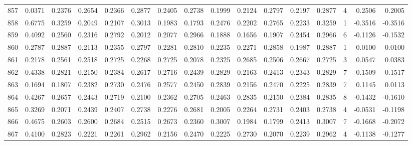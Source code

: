 \begin{tabular}{lrrrrrrrrrrrrrrr}
857 &      0.0371 &  0.2376 &  0.2654 &  0.2366 &  0.2877 &  0.2405 &  0.2738 &  0.1999 &  0.2124 &  0.2797 &   0.2197 &     0.2877 &      4 &                    0.2506 &                     0.2005 \\
858 &      0.6775 &  0.3259 &  0.2049 &  0.2107 &  0.3013 &  0.1983 &  0.1793 &  0.2476 &  0.2202 &  0.2765 &   0.2233 &     0.3259 &      1 &                   -0.3516 &                    -0.3516 \\
859 &      0.4092 &  0.2560 &  0.2316 &  0.2792 &  0.2012 &  0.2077 &  0.2966 &  0.1888 &  0.1656 &  0.1907 &   0.2454 &     0.2966 &      6 &                   -0.1126 &                    -0.1532 \\
860 &      0.2787 &  0.2887 &  0.2113 &  0.2355 &  0.2797 &  0.2281 &  0.2810 &  0.2235 &  0.2271 &  0.2858 &   0.1987 &     0.2887 &      1 &                    0.0100 &                     0.0100 \\
861 &      0.2178 &  0.2561 &  0.2518 &  0.2725 &  0.2268 &  0.2725 &  0.2078 &  0.2325 &  0.2685 &  0.2506 &   0.2667 &     0.2725 &      3 &                    0.0547 &                     0.0383 \\
862 &      0.4338 &  0.2821 &  0.2150 &  0.2384 &  0.2617 &  0.2716 &  0.2439 &  0.2829 &  0.2163 &  0.2413 &   0.2343 &     0.2829 &      7 &                   -0.1509 &                    -0.1517 \\
863 &      0.1694 &  0.1807 &  0.2382 &  0.2730 &  0.2476 &  0.2577 &  0.2450 &  0.2839 &  0.2156 &  0.2470 &   0.2225 &     0.2839 &      7 &                    0.1145 &                     0.0113 \\
864 &      0.4267 &  0.2657 &  0.2443 &  0.2719 &  0.2100 &  0.2362 &  0.2705 &  0.2463 &  0.2835 &  0.2150 &   0.2384 &     0.2835 &      8 &                   -0.1432 &                    -0.1610 \\
865 &      0.3269 &  0.2071 &  0.2439 &  0.2407 &  0.2738 &  0.2276 &  0.2681 &  0.2005 &  0.2264 &  0.2731 &   0.2403 &     0.2738 &      4 &                   -0.0531 &                    -0.1198 \\
866 &      0.4675 &  0.2603 &  0.2600 &  0.2684 &  0.2515 &  0.2673 &  0.2360 &  0.3007 &  0.1984 &  0.1799 &   0.2413 &     0.3007 &      7 &                   -0.1668 &                    -0.2072 \\
867 &      0.4100 &  0.2823 &  0.2221 &  0.2261 &  0.2962 &  0.2156 &  0.2470 &  0.2225 &  0.2730 &  0.2070 &   0.2239 &     0.2962 &      4 &                   -0.1138 &                    -0.1277 \\

\end{tabular}

